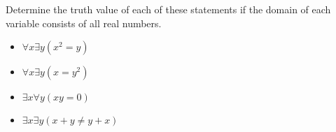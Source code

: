 \documentclass{article}
\newenvironment{problem}[2][Problem]{\begin{trivlist}
\item[\hskip \labelsep {\bfseries #1}\hskip \labelsep {\bfseries #2.}]}{\end{trivlist}}
\begin{document}
\begin{problem}{18}
Determine the truth value of each of these statements if the domain of each variable consists of all real numbers.
\begin{itemize}
    \item[(a)] $\forall x \exists y (x^2=y)$
    \item[(b)] $\forall x \exists y (x = y^2)$
    \item[(c)] $\exists x \forall y (xy=0) $
    \item[(d)] $\exists x \exists y (x + y \neq y + x) $
\end{itemize}


\end{problem}
\end{document}
